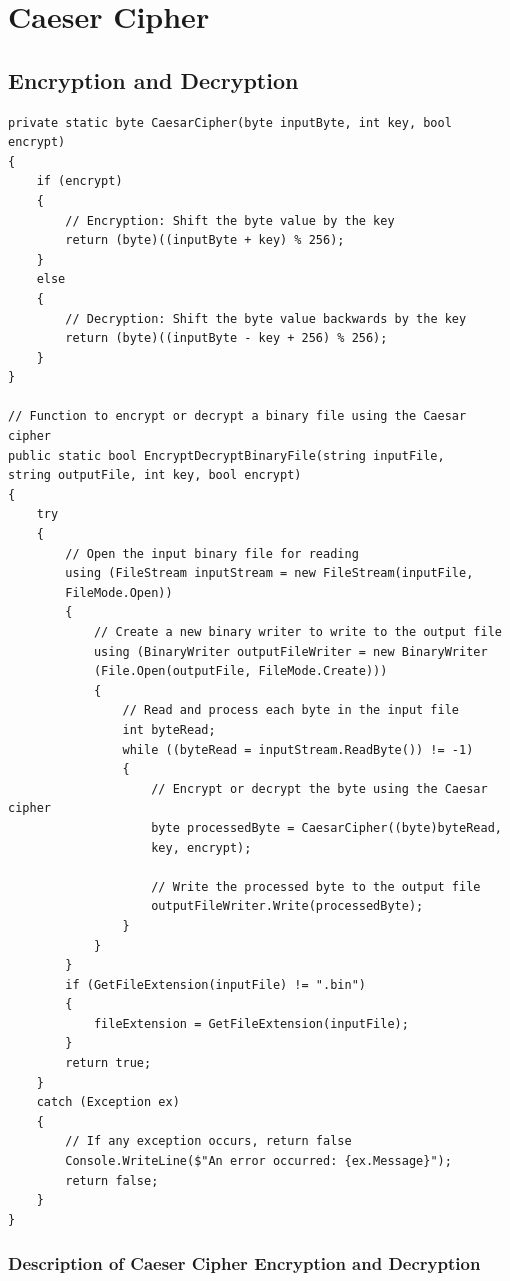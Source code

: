 \documentclass[a4paper,oneside,11pt]{book}
\begin{document}
\chapter[Caeser Cipher]{Caeser Cipher}
\section{Encryption and Decryption}
\begin{lstlisting}[language=Csh, caption={Code for Encryption and Decryption of Caeser Cipher}]
private static byte CaesarCipher(byte inputByte, int key, bool encrypt)
{
    if (encrypt)
    {
        // Encryption: Shift the byte value by the key
        return (byte)((inputByte + key) % 256);
    }
    else
    {
        // Decryption: Shift the byte value backwards by the key
        return (byte)((inputByte - key + 256) % 256);
    }
}
    
// Function to encrypt or decrypt a binary file using the Caesar cipher
public static bool EncryptDecryptBinaryFile(string inputFile, 
string outputFile, int key, bool encrypt)
{
    try
    {
        // Open the input binary file for reading
        using (FileStream inputStream = new FileStream(inputFile, 
        FileMode.Open))
        {
            // Create a new binary writer to write to the output file
            using (BinaryWriter outputFileWriter = new BinaryWriter
            (File.Open(outputFile, FileMode.Create)))
            {
                // Read and process each byte in the input file
                int byteRead;
                while ((byteRead = inputStream.ReadByte()) != -1)
                {
                    // Encrypt or decrypt the byte using the Caesar cipher
                    byte processedByte = CaesarCipher((byte)byteRead, 
                    key, encrypt);
    
                    // Write the processed byte to the output file
                    outputFileWriter.Write(processedByte);
                }
            }
        }
        if (GetFileExtension(inputFile) != ".bin")
        {
            fileExtension = GetFileExtension(inputFile);
        }
        return true;
    }
    catch (Exception ex)
    {
        // If any exception occurs, return false
        Console.WriteLine($"An error occurred: {ex.Message}");
        return false;
    }
}
\end{lstlisting}

\subsection{Description of Caeser Cipher Encryption and Decryption}
\end{document}
